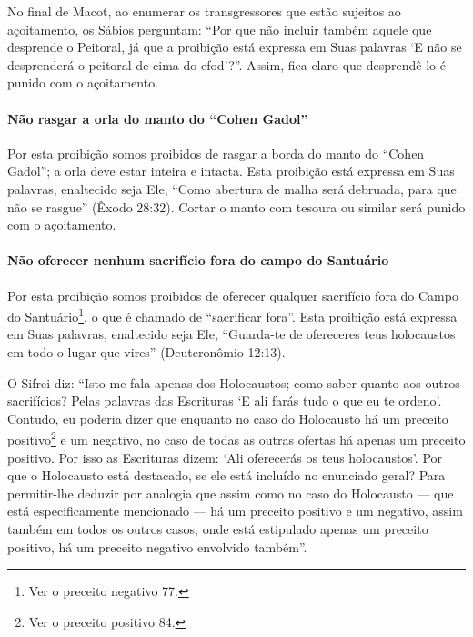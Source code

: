 No final de Macot, ao enumerar os transgressores que estão sujeitos ao
açoitamento, os Sábios perguntam: ``Por que não incluir também aquele
que desprende o Peitoral, já que a proibição está expressa em Suas
palavras `E não se desprenderá o peitoral de cima do efod'?''. Assim,
fica claro que desprendê-lo é punido com o açoitamento.

\paragraph{Não rasgar a orla do manto do ``Cohen Gadol''}

Por esta proibição somos proibidos de rasgar a borda do manto do ``Cohen
Gadol''; a orla deve estar inteira e intacta. Esta proibição está
expressa em Suas palavras, enaltecido seja Ele, ``Como abertura de malha
será debruada, para que não se rasgue'' (Êxodo 28:32). Cortar o manto
com tesoura ou similar será punido com o açoitamento.

\paragraph{Não oferecer nenhum sacrifício fora do campo do Santuário}

Por esta proibição somos proibidos de oferecer qualquer sacrifício fora
do Campo do Santuário\footnote{Ver o preceito negativo 77.}, o que é chamado de
``sacrificar fora''. Esta proibição está expressa em Suas palavras,
enaltecido seja Ele, ``Guarda-te de ofereceres teus holocaustos em todo
o lugar que vires'' (Deuteronômio 12:13).

O Sifrei diz: ``Isto me fala apenas dos Holocaustos; como saber quanto
aos outros sacrifícios? Pelas palavras das Escrituras `E ali farás tudo
o que eu te ordeno'. Contudo, eu poderia dizer que enquanto no caso do
Holocausto há um preceito positivo\footnote{Ver o preceito positivo 84.} e um negativo,
no caso de todas as outras ofertas há apenas um preceito positivo. Por
isso as Escrituras dizem: `Ali oferecerás os teus holocaustos'. Por que
o Holocausto está destacado, se ele está incluído no enunciado geral?
Para permitir-lhe deduzir por analogia que assim como no caso do
Holocausto --- que está especificamente mencionado --- há um preceito
positivo e um negativo, assim também em todos os outros casos, onde está
estipulado apenas um preceito positivo, há um preceito negativo
envolvido também''.

